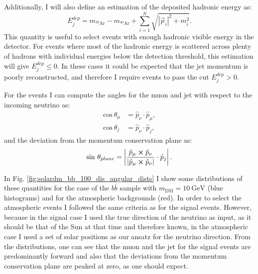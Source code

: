 Additionally, I will also define an estimation of the deposited hadronic energy as:
\begin{equation}
	E_{j}^{dep} = m_{^{39}\mathrm{Ar}} - m_{^{40}\mathrm{Ar}} + \sum_{i=1}^{N} \sqrt{|\vec{p}_{i}|^{2} + m_{i}^{2}}.
\end{equation}
This quantity is useful to select events with enough hadronic visible energy in the detector. For events where most of the hadronic energy is scattered across plenty of hadrons with individual energies below the detection threshold, this estimation will give $E_{j}^{dep} \leq 0$. In these cases it could be expected that the jet momentum is poorly reconstructed, and therefore I require events to pass the cut $E_{j}^{dep} > 0$.

For the events I can compute the angles for the muon and jet with respect to the incoming neutrino as:
\begin{align}
	\mathrm{cos} \ \theta_{\mu} &= \hat{p}_{\nu} \cdot \hat{p}_{\mu},\\
	\mathrm{cos} \ \theta_{j} &= \hat{p}_{\nu} \cdot \hat{p}_{j},
\end{align}
and the deviation from the momentum conservation plane as:
\begin{equation}
	\mathrm{sin} \ \theta_{plane} = \left|\frac{\hat{p}_{\mu} \cross \hat{p}_{\nu}}{|\hat{p}_{\mu} \cross \hat{p}_{\nu}|} \cdot \hat{p}_{j}\right|.
\end{equation}

In Fig. \ref{fig:solardm_bb_100_dis_angular_dists} I show some distributions of these quantities for the case of the $b\bar{b}$ sample with $m_{\mathrm{DM}} = 10 \ \mathrm{GeV}$ (blue histograms) and for the atmospheric backgrounds (red). In order to select the atmospheric events I followed the same criteria as for the signal events. However, because in the signal case I used the true direction of the neutrino as input, as it should be that of the Sun at that time and therefore known, in the atmospheric case I used a set of solar positions as our ansatz for the neutrino direction. From the distributions, one can see that the muon and the jet for the signal events are predominantly forward and also that the deviations from the momentum conservation plane are peaked at zero, as one should expect.

